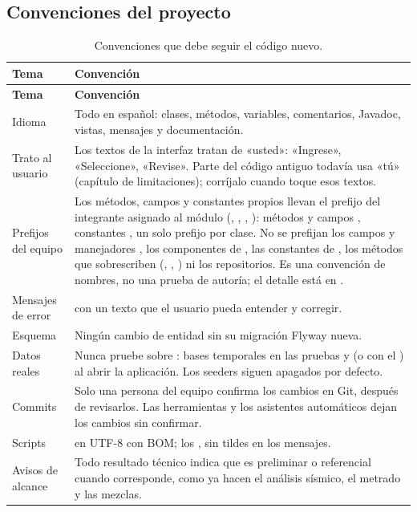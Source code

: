 \subsection{Convenciones del proyecto}
\label{sec:amp-convenciones}

\begin{longtable}{L{3.6cm}L{11.2cm}}
	\caption{Convenciones que debe seguir el código nuevo.} \label{tab:amp-convenciones} \\
	\hline
	\textbf{Tema} & \textbf{Convención} \\ \hline
	\endfirsthead
	\hline
	\textbf{Tema} & \textbf{Convención} \\ \hline
	\endhead
	\hline
	\endfoot
	Idioma & Todo en español: clases, métodos, variables, comentarios, Javadoc, vistas, mensajes y documentación. \\
	Trato al usuario & Los textos de la interfaz tratan de «usted»: «Ingrese», «Seleccione», «Revise». Parte del
	código antiguo todavía usa «tú» (capítulo de limitaciones); corríjalo cuando toque esos textos. \\
	Prefijos del equipo & Los métodos, campos y constantes propios llevan el prefijo del integrante asignado al
	módulo (, , , ): métodos y campos
	, constantes , un solo prefijo por clase. No se prefijan los campos y
	manejadores , los componentes de , las constantes de , los métodos que
	sobrescriben (, , ) ni los repositorios. Es una convención de nombres, no
	una prueba de autoría; el detalle está en . \\
	Mensajes de error &  con un texto que el usuario pueda entender y corregir. \\
	Esquema & Ningún cambio de entidad sin su migración Flyway nueva. \\
	Datos reales & Nunca pruebe sobre : bases temporales en las pruebas
	y  (o  con el ) al abrir la aplicación.
	Los seeders siguen apagados por defecto. \\
	Commits & Solo una persona del equipo confirma los cambios en Git, después de revisarlos. Las herramientas y los
	asistentes automáticos dejan los cambios sin confirmar. \\
	Scripts &  en UTF-8 con BOM; los , sin tildes en los mensajes. \\
	Avisos de alcance & Todo resultado técnico indica que es preliminar o referencial cuando corresponde, como ya hacen
	el análisis sísmico, el metrado y las mezclas. \\
\end{longtable}

